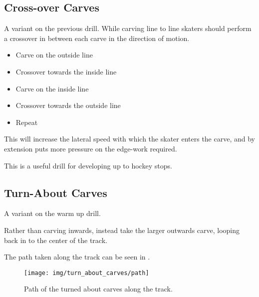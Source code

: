\subsection*{Cross-over Carves}

A variant on the previous drill. 
While carving line to line skaters should perform a crossover in between each carve in the direction of motion.

\begin{itemize}
    \item Carve on the outside line
    \item Crossover towards the inside line 
    \item Carve on the inside line
    \item Crossover towards the outside line
    \item Repeat 
\end{itemize}

This will increase the lateral speed with which the skater enters the carve, and by extension puts more pressure on the edge-work required.      

This is a useful drill for developing up to hockey stops.

\subsection*{Turn-About Carves}

A variant on the warm up drill.

Rather than carving inwards, instead take the larger outwards carve, looping back in to the center of the track. 

The path taken along the track can be seen in . 

\begin{figure*}
\centering
\texttt{[image: img/turn\_about\_carves/path]}
\caption{Path of the turned about carves along the track. \label{fig:sticky/carves/turn_about}}
\end{figure*}

